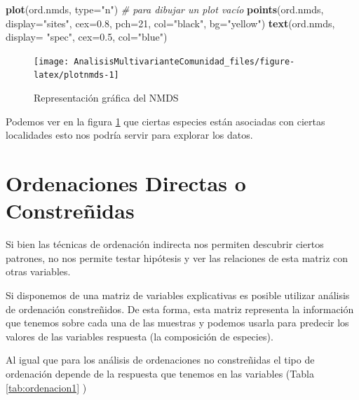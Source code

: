 \documentclass[]{book}
\newenvironment{Shaded}{\begin{snugshade}}{\end{snugshade}}
\newcommand{\KeywordTok}[1]{\textcolor[rgb]{0.13,0.29,0.53}{\textbf{{#1}}}}
\newcommand{\DataTypeTok}[1]{\textcolor[rgb]{0.13,0.29,0.53}{{#1}}}
\newcommand{\DecValTok}[1]{\textcolor[rgb]{0.00,0.00,0.81}{{#1}}}
\newcommand{\FloatTok}[1]{\textcolor[rgb]{0.00,0.00,0.81}{{#1}}}
\newcommand{\StringTok}[1]{\textcolor[rgb]{0.31,0.60,0.02}{{#1}}}
\newcommand{\CommentTok}[1]{\textcolor[rgb]{0.56,0.35,0.01}{\textit{{#1}}}}
\newcommand{\NormalTok}[1]{{#1}}
\begin{document}
\begin{Shaded}
\begin{Highlighting}[]
\KeywordTok{plot}\NormalTok{(ord.nmds, }\DataTypeTok{type=}\StringTok{"n"}\NormalTok{)  }\CommentTok{# para dibujar un plot vacío}
\KeywordTok{points}\NormalTok{(ord.nmds, }\DataTypeTok{display=}\StringTok{"sites"}\NormalTok{, }\DataTypeTok{cex=}\FloatTok{0.8}\NormalTok{, }\DataTypeTok{pch=}\DecValTok{21}\NormalTok{, }\DataTypeTok{col=}\StringTok{"black"}\NormalTok{, }\DataTypeTok{bg=}\StringTok{"yellow"}\NormalTok{)  }
\KeywordTok{text}\NormalTok{(ord.nmds, }\DataTypeTok{display=} \StringTok{"spec"}\NormalTok{, }\DataTypeTok{cex=}\FloatTok{0.5}\NormalTok{, }\DataTypeTok{col=}\StringTok{"blue"}\NormalTok{) }
\end{Highlighting}
\end{Shaded}

\begin{figure}

{\centering \texttt{[image: AnalisisMultivarianteComunidad\_files/figure-latex/plotnmds-1]} 

}

\caption{Representación gráfica del NMDS}\label{fig:plotnmds}
\end{figure}

Podemos ver en la figura \ref{fig:plotnmds} que ciertas especies están
asociadas con ciertas localidades esto nos podría servir para explorar
los datos.

\chapter{Ordenaciones Directas o
Constreñidas}\label{ordenaciones-directas-o-constrenidas}

Si bien las técnicas de ordenación indirecta nos permiten descubrir
ciertos patrones, no nos permite testar hipótesis y ver las relaciones
de esta matriz con otras variables.

Si disponemos de una matriz de variables explicativas es posible
utilizar análisis de ordenación constreñidos. De esta forma, esta matriz
representa la información que tenemos sobre cada una de las muestras y
podemos usarla para predecir los valores de las variables respuesta (la
composición de especies).

Al igual que para los análisis de ordenaciones no constreñidas el tipo
de ordenación depende de la respuesta que tenemos en las variables
(Tabla \ref{tab:ordenacion1} )
\end{document}
